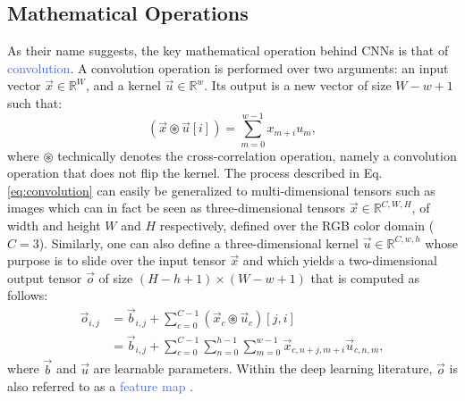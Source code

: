 \subsection{Mathematical Operations}
\label{sec:operations}

As their name suggests, the key mathematical operation behind CNNs is that of \textcolor{RoyalBlue}{convolution}. A convolution operation is performed over two arguments: an input vector $\vec{x}\in\mathds{R}^{W}$, and a kernel $\vec{u}\in\mathds{R}^{w}$. Its output is a new vector of size $W-w+1$ such that:
\begin{equation}
	(\vec{x}\circledast\vec{u}[i]) = \sum_{m=0}^{w-1}x_{m+i}u_m,
	\label{eq:convolution}
\end{equation}
where $\circledast$ technically denotes the cross-correlation operation, namely a convolution operation that does not flip the kernel. The process described in Eq. \ref{eq:convolution} can easily be generalized to multi-dimensional tensors such as images which can in fact be seen as three-dimensional tensors $\vec{x}\in\mathds{R}^{C,W,H}$, of width and height $W$ and $H$ respectively, defined over the RGB color domain ($C=3$). Similarly, one can also define a three-dimensional kernel $\vec{u}\in\mathds{R}^{C,w,h}$ whose purpose is to slide over the input tensor $\vec{x}$ and which yields a two-dimensional output tensor $\vec{o}$ of size $(H-h+1)\times(W-w+1)$ that is computed as follows:
\begin{equation}
	\begin{split}
		\vec{o}_{i,j} & = \vec{b}_{i,j} + \sum_{c=0}^{C-1}(\vec{x}_c\circledast\vec{u}_c)[j,i] \\ 
			      & = \vec{b}_{i,j} + \sum_{c=0}^{C-1} \sum_{n=0}^{h-1}\sum_{m=0}^{w-1} \vec{x}_{c,n+j,m+i}\vec{u}_{c,n,m},
	\end{split}
\end{equation}
where $\vec{b}$ and $\vec{u}$ are learnable parameters. Within the deep learning literature, $\vec{o}$ is also referred to as a \textcolor{RoyalBlue}{feature map} \cite{goodfellow2016deep}.

